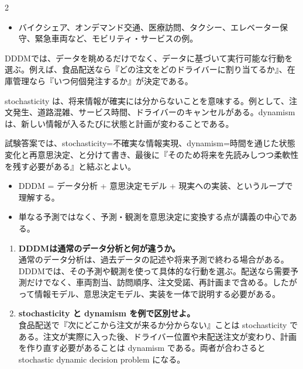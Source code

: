 \clearpage
{}
\begin{multicols}{2}\footnotesize\raggedcolumns
{}
\begin{itemize}
\item バイクシェア、オンデマンド交通、医療訪問、タクシー、エレベーター保守、緊急車両など、モビリティ・サービスの例。
\end{itemize}
DDDMでは、データを眺めるだけでなく、データに基づいて実行可能な行動を選ぶ。例えば、食品配送なら『どの注文をどのドライバーに割り当てるか』、在庫管理なら『いつ何個発注するか』が決定である。\par

stochasticity は、将来情報が確実には分からないことを意味する。例として、注文発生、道路混雑、サービス時間、ドライバーのキャンセルがある。dynamism は、新しい情報が入るたびに状態と計画が変わることである。\par

試験答案では、stochasticity=不確実な情報実現、dynamism=時間を通じた状態変化と再意思決定、と分けて書き、最後に『そのため将来を先読みしつつ柔軟性を残す必要がある』と結ぶとよい。\par
{}
\begin{itemize}
\item DDDM = データ分析 + 意思決定モデル + 現実への実装、というループで理解する。
\item 単なる予測ではなく、予測・観測を意思決定に変換する点が講義の中心である。
\end{itemize}
\begin{enumerate}
\item \textbf{DDDMは通常のデータ分析と何が違うか。}\\通常のデータ分析は、過去データの記述や将来予測で終わる場合がある。DDDMでは、その予測や観測を使って具体的な行動を選ぶ。配送なら需要予測だけでなく、車両割当、訪問順序、注文受諾、再計画まで含める。したがって情報モデル、意思決定モデル、実装を一体で説明する必要がある。
\item \textbf{stochasticity と dynamism を例で区別せよ。}\\食品配送で『次にどこから注文が来るか分からない』ことは stochasticity である。注文が実際に入った後、ドライバー位置や未配送注文が変わり、計画を作り直す必要があることは dynamism である。両者が合わさると stochastic dynamic decision problem になる。
\end{enumerate}
\end{multicols}


